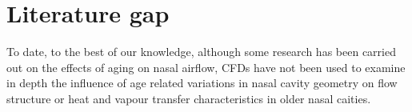 \section{Literature gap}

To date, to the best of our knowledge, although some research has been carried out on the effects of aging on nasal airflow, CFDs have not been used to examine in depth the influence of age related variations in nasal cavity geometry on flow structure or heat and vapour transfer characteristics in older nasal caities. 

%
%

